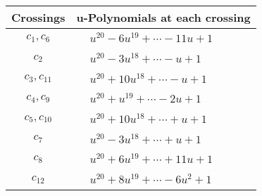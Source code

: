 \documentclass[1p]{elsarticle_modified}
\theoremstyle{definition}
\begin{document}
\begin{tabular}{m{50pt}|m{274pt}}
Crossings & \hspace{64pt}u-Polynomials at each crossing \\
\hline $$\begin{aligned}c_{1},c_{6}\end{aligned}$$&$\begin{aligned}
&u^{20}-6 u^{19}+\cdots-11 u+1
\end{aligned}$\\
\hline $$\begin{aligned}c_{2}\end{aligned}$$&$\begin{aligned}
&u^{20}-3 u^{18}+\cdots- u+1
\end{aligned}$\\
\hline $$\begin{aligned}c_{3},c_{11}\end{aligned}$$&$\begin{aligned}
&u^{20}+10 u^{18}+\cdots- u+1
\end{aligned}$\\
\hline $$\begin{aligned}c_{4},c_{9}\end{aligned}$$&$\begin{aligned}
&u^{20}+u^{19}+\cdots-2 u+1
\end{aligned}$\\
\hline $$\begin{aligned}c_{5},c_{10}\end{aligned}$$&$\begin{aligned}
&u^{20}+10 u^{18}+\cdots+u+1
\end{aligned}$\\
\hline $$\begin{aligned}c_{7}\end{aligned}$$&$\begin{aligned}
&u^{20}-3 u^{18}+\cdots+u+1
\end{aligned}$\\
\hline $$\begin{aligned}c_{8}\end{aligned}$$&$\begin{aligned}
&u^{20}+6 u^{19}+\cdots+11 u+1
\end{aligned}$\\
\hline $$\begin{aligned}c_{12}\end{aligned}$$&$\begin{aligned}
&u^{20}+8 u^{19}+\cdots-6 u^2+1
\end{aligned}$\\
\hline
\end{tabular}\\~\\
\end{document}
